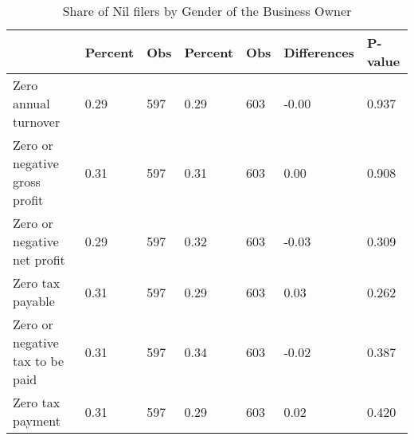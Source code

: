 \begin{table}[htbp]
\caption{\label{tab:table10} Share of Nil filers by Gender of the Business Owner}\centering\medskip
\begin{tabular}{lllllll} \hline \hline
 & Percent  & Obs  & Percent  & Obs  & Differences  & P-value  \\  \hline 
Zero annual turnover &         0.29 &          597 &      0.29 &          603 &        -0.00 &        0.937 \\  
Zero or negative gross profit &         0.31 &          597 &      0.31 &          603 &         0.00 &        0.908 \\  
Zero or negative net profit &         0.29 &          597 &      0.32 &          603 &        -0.03 &        0.309 \\  
Zero tax payable &         0.31 &          597 &      0.29 &          603 &         0.03 &        0.262 \\  
Zero or negative tax to be paid &         0.31 &          597 &      0.34 &          603 &        -0.02 &        0.387 \\  
Zero tax payment &         0.31 &          597 &      0.29 &          603 &         0.02 &        0.420 \\  
\hline \hline \end{tabular}
\end{table}
